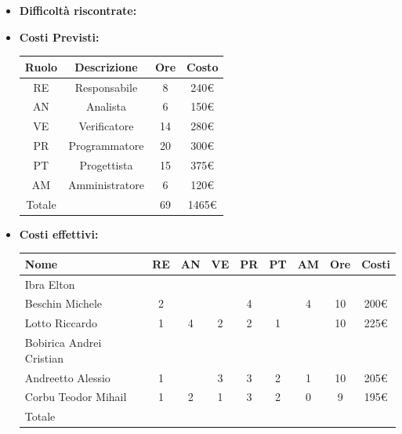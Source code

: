 \begin{itemize}
\begin{itemize}
            \end{itemize}
            \item \textbf{Difficoltà riscontrate:}
            \item \textbf{Costi Previsti:}
            \begin{longtable}{|c|c|c|c|}
                \hline
                Ruolo & Descrizione & Ore & Costo \\
                \hline
                RE & Responsabile & 8 &  240€\\
                \hline
                AN & Analista & 6 &  150€\\
                \hline
                VE & Verificatore & 14 &  280€\\
                \hline
                PR & Programmatore & 20 & 300€ \\
                \hline
                PT & Progettista & 15 & 375€ \\
                \hline
                AM & Amministratore & 6 &  120€\\
                \hline
                Totale & & 69 & 1465€ \\
                \hline
                \end{longtable}
            \item \textbf{Costi effettivi:}
            \begin{longtable}{|p{}|c|c|c|c|c|c|c|c|}
                \hline
                Nome & RE & AN & VE & PR & PT & AM & Ore & Costi\\
                \hline
                Ibra \newline Elton & & & & & & & & \\
                \hline
                Beschin Michele & 2& & & 4& & 4& 10&200€ \\
                \hline
                Lotto \newline Riccardo & 1& 4& 2& 2& 1& & 10& 225€\\
                \hline
                Bobirica Andrei Cristian & & & & & & & & \\
                \hline
                Andreetto Alessio & 1& & 3& 3& 2& 1& 10& 205€\\
                \hline
                Corbu Teodor Mihail & 1& 2& 1& 3& 2& 0& 9& 195€\\
                \hline
                Totale & & & & & & & & \\
                \hline
            \end{longtable}
            \end{itemize}


